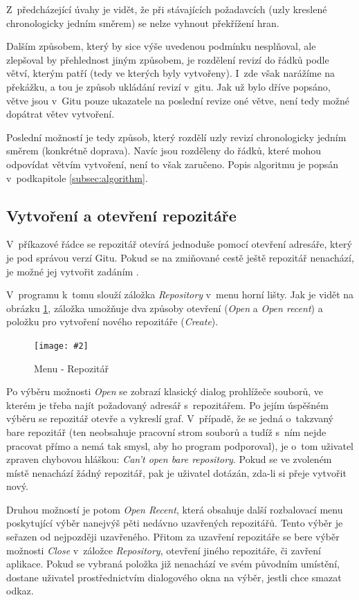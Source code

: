 \documentclass[
  biblatex,
  glossaries,
  index
]{kidiplom}
\newcommand{\pic}[4]{
\begin{figure}[h]
\centering
\texttt{[image: \#2]}
\caption{#3}
\label{fig:#4}
\end{figure}}
\begin{document}
Z~předcházející úvahy je vidět, že při stávajících požadavcích (uzly kreslené chronologicky jedním směrem) se nelze vyhnout překřížení hran.

Dalším způsobem, který by sice výše uvedenou podmínku nesplňoval, ale
zlepšoval by přehlednost jiným způsobem, je rozdělení revizí do řádků podle větví, kterým patří (tedy ve kterých byly vytvořeny). I~zde však narážíme na překážku, a tou je způsob ukládání revizí v~gitu. Jak už bylo dříve popsáno, větve jsou v~Gitu pouze ukazatele na poslední revize oné větve, není tedy možné dopátrat větev vytvoření.

Poslední možností je tedy způsob, který rozdělí uzly revizí chronologicky jedním směrem (konkrétně doprava). Navíc jsou rozděleny do řádků, které mohou odpovídat větvím vytvoření, není to však zaručeno. Popis algoritmu je popsán v~podkapitole \ref{subsec:algorithm}.

\subsection{Vytvoření a otevření repozitáře}
V~příkazové řádce se repozitář otevírá jednoduše pomocí otevření adresáře, který je pod správou verzí Gitu. Pokud se na zmiňované cestě ještě repozitář nenachází, je možné jej vytvořit zadáním .

V~programu k~tomu slouží záložka {\it Repository} v~menu horní lišty. Jak je vidět na obrázku \ref{fig:menu-repository}, záložka umožňuje dva způsoby otevření ({\it Open} a {\it Open recent}) a položku pro vytvoření nového repozitáře ({\it Create}).

\pic{10cm}{Repository.png}{Menu - Repozitář}{menu-repository}

Po výběru možnosti {\it Open} se zobrazí klasický dialog prohlížeče souborů, ve kterém je třeba najít požadovaný adresář s~repozitářem. Po jejím úspěšném výběru se repozitář otevře a vykreslí graf. V~případě, že se jedná o~takzvaný bare repozitář (ten neobsahuje pracovní strom souborů a tudíž s~ním nejde pracovat přímo a nemá tak smysl, aby ho program podporoval), je o~tom uživatel zpraven chybovou hláškou: {\it Can't open bare repository}. Pokud se ve zvoleném místě nenachází žádný repozitář, pak je uživatel dotázán, zda-li si přeje vytvořit nový.

Druhou možností je potom {\it Open Recent}, která obsahuje další rozbalovací menu poskytující výběr nanejvýš pěti nedávno uzavřených repozitářů. Tento výběr je seřazen od nejpozději uzavřeného. Přitom za uzavření repozitáře se bere výběr možnosti {\it Close} v~záložce {\it Repository}, otevření jiného repozitáře, či zavření aplikace. Pokud se vybraná položka již nenachází ve svém původním umístění, dostane uživatel prostřednictvím dialogového okna na výběr, jestli chce smazat odkaz.
\end{document}
